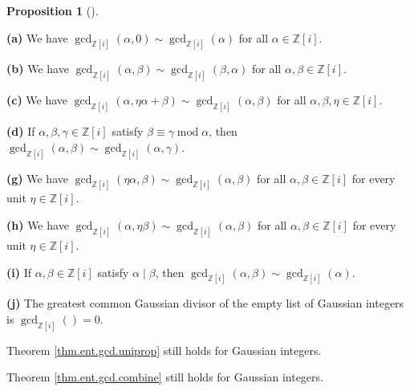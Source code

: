 \documentclass[numbers=enddot,12pt,final,onecolumn,notitlepage]{scrartcl}%
\numberwithin{exer}{subsection}
\theoremstyle{definition}
\newtheorem{prop}[theo]{Proposition}
\newenvironment{proposition}[1][]
{\begin{prop}[#1]\begin{leftbar}}
{\end{leftbar}\end{prop}}
\begin{document}
\begin{proposition}
\label{prop.Z[i].gauss.gcdrules}\textbf{(a)} We have $\gcd
\nolimits_{\mathbb{Z}\left[  i\right]  }\left(  \alpha,0\right)  \sim
\gcd\nolimits_{\mathbb{Z}\left[  i\right]  }\left(  \alpha\right)  $ for all
$\alpha\in\mathbb{Z}\left[  i\right]  $.

\textbf{(b)} We have $\gcd\nolimits_{\mathbb{Z}\left[  i\right]  }\left(
\alpha,\beta\right)  \sim\gcd\nolimits_{\mathbb{Z}\left[  i\right]  }\left(
\beta,\alpha\right)  $ for all $\alpha,\beta\in\mathbb{Z}\left[  i\right]  $.

\textbf{(c)} We have $\gcd\nolimits_{\mathbb{Z}\left[  i\right]  }\left(
\alpha,\eta\alpha+\beta\right)  \sim\gcd\nolimits_{\mathbb{Z}\left[  i\right]
}\left(  \alpha,\beta\right)  $ for all $\alpha,\beta,\eta\in\mathbb{Z}\left[
i\right]  $.

\textbf{(d)} If $\alpha,\beta,\gamma\in\mathbb{Z}\left[  i\right]  $ satisfy
$\beta\equiv\gamma\operatorname{mod}\alpha$, then $\gcd\nolimits_{\mathbb{Z}%
\left[  i\right]  }\left(  \alpha,\beta\right)  \sim\gcd\nolimits_{\mathbb{Z}%
\left[  i\right]  }\left(  \alpha,\gamma\right)  $.

\textbf{(g)} We have $\gcd\nolimits_{\mathbb{Z}\left[  i\right]  }\left(
\eta\alpha,\beta\right)  \sim\gcd\nolimits_{\mathbb{Z}\left[  i\right]
}\left(  \alpha,\beta\right)  $ for all $\alpha,\beta\in\mathbb{Z}\left[
i\right]  $ for every unit $\eta\in\mathbb{Z}\left[  i\right]  $.

\textbf{(h)} We have $\gcd\nolimits_{\mathbb{Z}\left[  i\right]  }\left(
\alpha,\eta\beta\right)  \sim\gcd\nolimits_{\mathbb{Z}\left[  i\right]
}\left(  \alpha,\beta\right)  $ for all $\alpha,\beta\in\mathbb{Z}\left[
i\right]  $ for every unit $\eta\in\mathbb{Z}\left[  i\right]  $.

\textbf{(i)} If $\alpha,\beta\in\mathbb{Z}\left[  i\right]  $ satisfy
$\alpha\mid\beta$, then $\gcd\nolimits_{\mathbb{Z}\left[  i\right]  }\left(
\alpha,\beta\right)  \sim\gcd\nolimits_{\mathbb{Z}\left[  i\right]  }\left(
\alpha\right)  $.

\textbf{(j)} The greatest common Gaussian divisor of the empty list of
Gaussian integers is $\gcd\nolimits_{\mathbb{Z}\left[  i\right]  }\left(
{}\right)  =0$.
\end{proposition}

Theorem \ref{thm.ent.gcd.uniprop} still holds for Gaussian integers.

Theorem \ref{thm.ent.gcd.combine} still holds for Gaussian integers.
\end{document}
